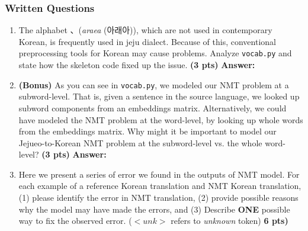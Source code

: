 \documentclass{assignment format}
\newenvironment{answer}{
    {\bf Answer:} \begingroup\color{red}
}{\endgroup}%
\begin{document}
\begin{enumerate}[label=(\alph*)]
\end{enumerate}

\subsubsection{Written Questions}
\begin{enumerate}[label=(\alph*)]
\item The alphabet 、(\textit{araea} (아래아)), which are not used in contemporary Korean, is frequently used in jeju dialect. Because of this, conventional preprocessing tools for Korean may cause problems. Analyze \texttt{vocab.py} and state how the skeleton code fixed up the issue. \textbf{(3 pts)}
\begin{answer}
\end{answer}

\item  \textbf{(Bonus)} As you can see in \texttt{vocab.py}, we modeled our NMT problem at a subword-level. That is, given a sentence in the source language, we looked up subword components from an embeddings matrix. Alternatively, we could have modeled the NMT problem at the word-level, by looking up whole words from the embeddings matrix. Why might it be important to model our Jejueo-to-Korean NMT problem at the subword-level vs. the whole word-level?  \textbf{(3 pts)}
\begin{answer}
\end{answer}

\item  Here we present a series of error we found in the outputs of NMT model. For each example of a reference Korean translation and NMT Korean translation, (1) please identify the error in NMT translation, (2) provide possible reasons why the model may have made the errors, and (3) Describe \textbf{ONE} possible way to fix the observed error. ($<unk>$ refers to \textit{unknown} token) \textbf{6 pts)}


\end{enumerate}
\end{document}
